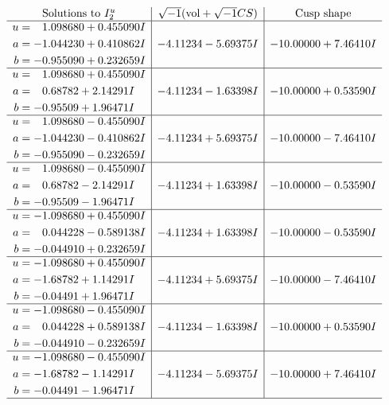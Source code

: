 \documentclass[1p]{elsarticle_modified}
\theoremstyle{definition}
\newcommand{\I}{\sqrt{-1}}
\begin{document}
$$\begin{array}{c|c|c}  
\text{Solutions to }I^u_{2}& \I (\text{vol} + \sqrt{-1}CS) & \text{Cusp shape}\\
 \hline 
\begin{aligned}
u &= \phantom{-}1.098680 + 0.455090 I \\
a &= -1.044230 + 0.410862 I \\
b &= -0.955090 + 0.232659 I\end{aligned}
 & -4.11234 - 5.69375 I & -10.00000 + 7.46410 I \\ \hline\begin{aligned}
u &= \phantom{-}1.098680 + 0.455090 I \\
a &= \phantom{-}0.68782 + 2.14291 I \\
b &= -0.95509 + 1.96471 I\end{aligned}
 & -4.11234 - 1.63398 I & -10.00000 + 0.53590 I \\ \hline\begin{aligned}
u &= \phantom{-}1.098680 - 0.455090 I \\
a &= -1.044230 - 0.410862 I \\
b &= -0.955090 - 0.232659 I\end{aligned}
 & -4.11234 + 5.69375 I & -10.00000 - 7.46410 I \\ \hline\begin{aligned}
u &= \phantom{-}1.098680 - 0.455090 I \\
a &= \phantom{-}0.68782 - 2.14291 I \\
b &= -0.95509 - 1.96471 I\end{aligned}
 & -4.11234 + 1.63398 I & -10.00000 - 0.53590 I \\ \hline\begin{aligned}
u &= -1.098680 + 0.455090 I \\
a &= \phantom{-}0.044228 - 0.589138 I \\
b &= -0.044910 + 0.232659 I\end{aligned}
 & -4.11234 + 1.63398 I & -10.00000 - 0.53590 I \\ \hline\begin{aligned}
u &= -1.098680 + 0.455090 I \\
a &= -1.68782 + 1.14291 I \\
b &= -0.04491 + 1.96471 I\end{aligned}
 & -4.11234 + 5.69375 I & -10.00000 - 7.46410 I \\ \hline\begin{aligned}
u &= -1.098680 - 0.455090 I \\
a &= \phantom{-}0.044228 + 0.589138 I \\
b &= -0.044910 - 0.232659 I\end{aligned}
 & -4.11234 - 1.63398 I & -10.00000 + 0.53590 I \\ \hline\begin{aligned}
u &= -1.098680 - 0.455090 I \\
a &= -1.68782 - 1.14291 I \\
b &= -0.04491 - 1.96471 I\end{aligned}
 & -4.11234 - 5.69375 I & -10.00000 + 7.46410 I\\
 \hline 
 \end{array}$$\newpage\newpage\renewcommand{\arraystretch}{1}
\end{document}
